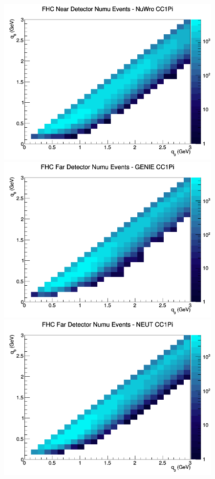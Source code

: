 \begin{figure}[h]
\includegraphics[width=\linewidth]{q0_q3/nominal/CC1Pi_FHC_ND_numu_q3_q0_NuWro.png}
\endminipage
\newline
{}
\includegraphics[width=\linewidth]{q0_q3/nominal/CC1Pi_FHC_FD_numu_q3_q0_GENIE.png}
\endminipage
{}
\includegraphics[width=\linewidth]{q0_q3/nominal/CC1Pi_FHC_FD_numu_q3_q0_NEUT.png}

\end{figure}

